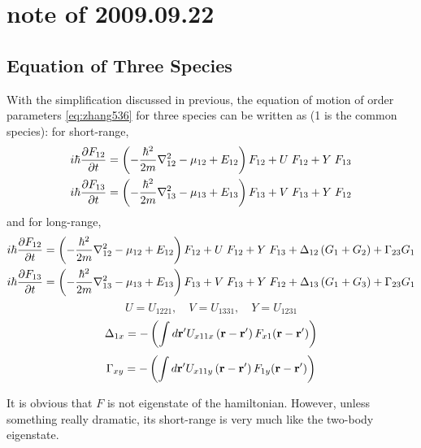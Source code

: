 
\section{note of 2009.09.22}
\subsection{Equation of Three Species}
With the simplification discussed in previous, the equation of motion of order parameters \eqref{eq:zhang536} for three species can be written as (1 is the common species):
for short-range,
\begin{align}\label{eq:short}
i\hbar\frac{\partial{F_{12}}}{\partial{t}}&=\left(-\frac{\hbar^2}{2m}\nabla_{12}^2-\mu_{12}+E_{12}\right)F_{12}+U\;F_{12}+Y\;F_{13}\notag\\*
i\hbar\frac{\partial{F_{13}}}{\partial{t}}&=\left(-\frac{\hbar^2}{2m}\nabla_{13}^2-\mu_{13}+E_{13}\right)F_{13}+V\;F_{13}+Y\;F_{12}
\end{align}
and for long-range,
\begin{align}\label{eq:long}
i\hbar\frac{\partial{F_{12}}}{\partial{t}}&=\left(-\frac{\hbar^2}{2m}\nabla_{12}^2-\mu_{12}+E_{12}\right)F_{12}+U\;F_{12}+Y\;F_{13}+\Delta_{12}\left(G_1+G_2\right)+\Gamma_{23}G_1\notag\\*
i\hbar\frac{\partial{F_{13}}}{\partial{t}}&=\left(-\frac{\hbar^2}{2m}\nabla_{13}^2-\mu_{13}+E_{13}\right)F_{13}+V\;F_{13}+Y\;F_{12}+\Delta_{13}\left(G_1+G_3\right)+\Gamma_{23}G_1
\end{align}
\[U=U_{1221},\quad{} V=U_{1331},\quad{} Y=U_{1231}\]
\[\Delta_{1x}=-\left(\int{d}\mathbf{r}'U_{x11x}\left(\mathbf{r}-\mathbf{r}'\right)F_{x1}(\mathbf{r}-\mathbf{r}')\right)\]
\[\Gamma_{xy}=-\left(\int{d}\mathbf{r}'U_{x11y}\left(\mathbf{r}-\mathbf{r}'\right)F_{1y}(\mathbf{r}-\mathbf{r}')\right)\]

It is obvious that $F$ is not eigenstate of the hamiltonian.  However, unless something really dramatic, its short-range is very much like the two-body eigenstate.  

